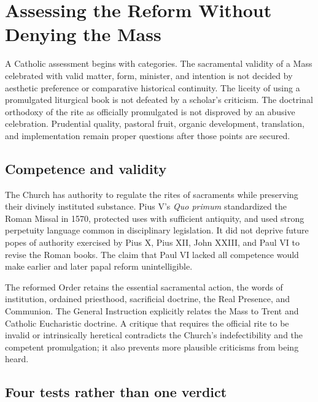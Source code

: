 \section{Assessing the Reform Without Denying the Mass}

A Catholic assessment begins with categories. The sacramental validity of a Mass celebrated with valid matter, form, minister, and intention is not decided by aesthetic preference or comparative historical continuity. The liceity of using a promulgated liturgical book is not defeated by a scholar's criticism. The doctrinal orthodoxy of the rite as officially promulgated is not disproved by an abusive celebration. Prudential quality, pastoral fruit, organic development, translation, and implementation remain proper questions after those points are secured.

\subsection{Competence and validity}

The Church has authority to regulate the rites of sacraments while preserving their divinely instituted substance. Pius V's \emph{Quo primum} standardized the Roman Missal in 1570, protected uses with sufficient antiquity, and used strong perpetuity language common in disciplinary legislation. It did not deprive future popes of authority exercised by Pius X, Pius XII, John XXIII, and Paul VI to revise the Roman books. The claim that Paul VI lacked all competence would make earlier and later papal reform unintelligible.

The reformed Order retains the essential sacramental action, the words of institution, ordained priesthood, sacrificial doctrine, the Real Presence, and Communion. The General Instruction explicitly relates the Mass to Trent and Catholic Eucharistic doctrine. A critique that requires the official rite to be invalid or intrinsically heretical contradicts the Church's indefectibility and the competent promulgation; it also prevents more plausible criticisms from being heard.

\subsection{Four tests rather than one verdict}


